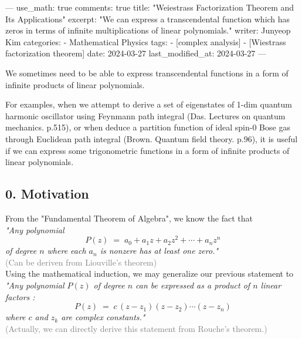 ---
use_math: true
comments: true
title:  "Weiestrass Factorization Theorem and Its Applications"
excerpt: "We can express a transcendental function which has zeros in terms of infinite multiplications of linear polynomials."
writer: Junyeop Kim
categories:
  - Mathematical Physics
tags:
  - [complex analysis]
  - [Wiestrass factorization theorem]
date: 2024-03-27
last_modified_at: 2024-03-27
---

\usepackage{geometry}
\geometry{ a4paper, left=20mm, right=20mm, top=13mm, bottom=13mm }
\usepackage{amsmath}
\usepackage{xcolor}
\usepackage{MnSymbol}%
\usepackage{wasysym}%

\setlength{\parindent}{0pt}



\quad We sometimes need to be able to express transcendental functions in a form of infinite products of linear polynomials.\

\quad For examples, when we attempt to derive a set of eigenstates of 1-dim quantum harmonic oscillator using Feynmann path integral (Das. Lectures on quantum mechanics. p.515), or when deduce a partition function of ideal spin-0 Bose gas through Euclidean path integral (Brown. Quantum field theory. p.96), it is useful if we can express some trigonometric functions in a form of infinite products of linear polynomials.\\


\subsection*{0. Motivation}
\vspace{2mm}
From the "Fundamental Theorem of Algebra", we know the fact that\\
 
\textit{"Any polynomial $$ P(z) \;=\; a_0 + a_1 z + a_2 z^2 + \cdots + a_n z^n $$ of degree $n$ where each $a_n$ is nonzere has at least one zero."}\\
\textcolor{gray}{(Can be deriven from  Liouville's theorem)}\\

Using the mathematical induction, we may generalize our previous statement to\\

\textit{"Any polynomial $P(z)$ of degree $n$ can be expressed as a product of $n$ linear factors : $$ P(z) \;=\; c\, (z-z_1)(z-z_2)\cdots (z-z_n) $$ where $c$ and $z_k$ are complex constants."}\\
\textcolor{gray}{(Actually, we can directly derive this statement from Rouche's theorem.)}\\
 

